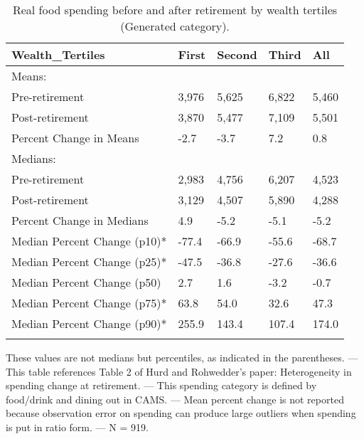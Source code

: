 \begin{table}[tbp] \centering
{}

\caption{Real food spending before and after retirement by wealth tertiles (Generated category).}
\begin{tabularx}{\textwidth}{lCCCC}

\toprule
{Wealth\_Tertiles}&{First}&{Second}&{Third}&{All} \tabularnewline
\midrule\addlinespace[1.5ex]
Means:&&&& \tabularnewline
\midrule Pre-retirement&3,976&5,625&6,822&5,460 \tabularnewline
Post-retirement&3,870&5,477&7,109&5,501 \tabularnewline
Percent Change in Means&-2.7&-3.7&7.2&0.8 \tabularnewline
\midrule Medians:&&&& \tabularnewline
\midrule Pre-retirement&2,983&4,756&6,207&4,523 \tabularnewline
Post-retirement&3,129&4,507&5,890&4,288 \tabularnewline
Percent Change in Medians&4.9&-5.2&-5.1&-5.2 \tabularnewline
Median Percent Change (p10)*&-77.4&-66.9&-55.6&-68.7 \tabularnewline
Median Percent Change (p25)*&-47.5&-36.8&-27.6&-36.6 \tabularnewline
Median Percent Change (p50)&2.7&1.6&-3.2&-0.7 \tabularnewline
Median Percent Change (p75)*&63.8&54.0&32.6&47.3 \tabularnewline
Median Percent Change (p90)*&255.9&143.4&107.4&174.0 \tabularnewline
\bottomrule \addlinespace[1.5ex]

\end{tabularx}
\begin{flushleft}
\footnotesize *These values are not medians but percentiles, as indicated in the parentheses. \linebreak --- \linebreak This table references Table 2 of Hurd and Rohwedder's paper: Heterogeneity in spending change at retirement. \linebreak --- \linebreak This spending category is defined by food/drink and dining out in CAMS. \linebreak --- \linebreak Mean percent change is not reported because observation error on spending can produce large outliers when spending is put in ratio form. \linebreak --- \linebreak N = 919.
\end{flushleft}
\end{table}
